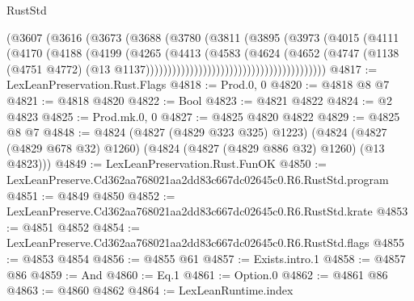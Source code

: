 \begin{lexlean}{RustStd}
\begin{coremodule}
                                            (@3607
                                              (@3616
                                                (@3673
                                                  (@3688
                                                    (@3780
                                                      (@3811
                                                        (@3895
                                                          (@3973
                                                            (@4015
                                                              (@4111
                                                                (@4170
                                                                  (@4188
                                                                    (@4199
                                                                      (@4265
                                                                        (@4413
                                                                          (@4583
                                                                            (@4624
                                                                              (@4652
                                                                                (@4747
                                                                                  (@1138
                                                                                    (@4751 @4772)
                                                                                    (@13
                                                                                      @1137)))))))))))))))))))))))))))))))))))))))))
@4817 := LexLeanPreservation.Rust.Flags
@4818 := Prod.{0, 0}
@4820 := @4818 @8 @7
@4821 := @4818 @4820
@4822 := Bool
@4823 := @4821 @4822
@4824 := @2 @4823
@4825 := Prod.mk.{0, 0}
@4827 := @4825 @4820 @4822
@4829 := @4825 @8 @7
@4848 := @4824
    (@4827 (@4829 @323 @325) @1223)
    (@4824 (@4827 (@4829 @678 @32) @1260) (@4824 (@4827 (@4829 @886 @32) @1260) (@13 @4823)))
@4849 := LexLeanPreservation.Rust.FunOK
@4850 := LexLeanPreserve.Cd362aa768021aa2dd83c667dc02645c0.R6.RustStd.program
@4851 := @4849 @4850
@4852 := LexLeanPreserve.Cd362aa768021aa2dd83c667dc02645c0.R6.RustStd.krate
@4853 := @4851 @4852
@4854 := LexLeanPreserve.Cd362aa768021aa2dd83c667dc02645c0.R6.RustStd.flags
@4855 := @4853 @4854
@4856 := @4855 @61
@4857 := Exists.intro.{1}
@4858 := @4857 @86
@4859 := And
@4860 := Eq.{1}
@4861 := Option.{0}
@4862 := @4861 @86
@4863 := @4860 @4862
@4864 := LexLeanRuntime.index

\end{coremodule}
\end{lexlean}
